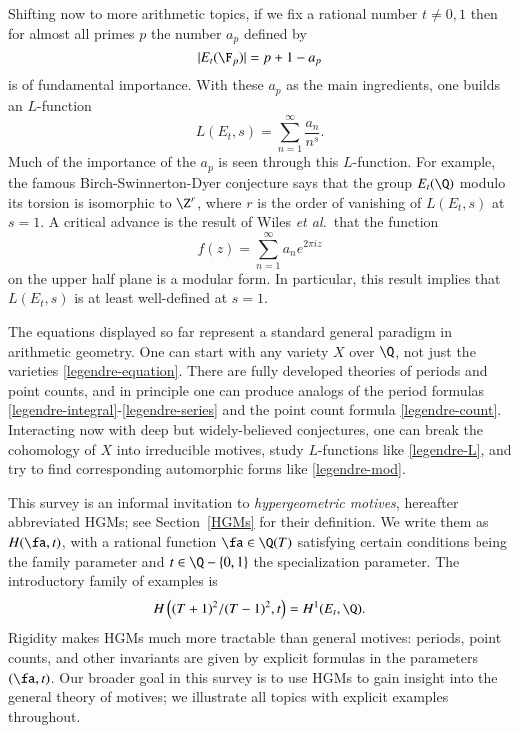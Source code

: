 \documentclass{notices}
\numberwithin{equation}{section}
\numberwithin{table}{section}
\numberwithin{figure}{section}
\begin{document}
Shifting now to more arithmetic topics, 
if we fix a rational number $t\neq 0,1$
then for almost all primes $p$ the number $a_p$ defined by
\begin{equation}
\label{legendre-count}
|E_t(\F_p)|=p+1-a_p
\end{equation}
is of fundamental importance.  With these $a_p$ as the main ingredients, one builds
an $L$-function 
\begin{equation}
\label{legendre-L} L(E_t,s) = \sum_{n=1}^\infty \frac{a_n}{n^s}.
\end{equation}
Much of the importance of the $a_p$ is seen through this 
$L$-function.  For example, the famous Birch-Swinnerton-Dyer
conjecture says that the group $E_t(\Q)$ modulo its torsion
is isomorphic to $\Z^r$, where $r$ is the order of vanishing 
of $L(E_t,s)$ at $s=1$.  A critical advance is the result of Wiles {\em et al.}\ that
the function 
\begin{equation}
\label{legendre-mod}
f(z) = \sum_{n=1}^\infty a_n e^{2 \pi i z} 
\end{equation}
on the upper half plane is a modular form.  In particular, this result
implies that $L(E_t,s)$ is at least well-defined at $s=1$. 

The equations displayed so far represent a standard general paradigm in 
arithmetic geometry.  One can start with any variety $X$ over $\Q$, not just the 
varieties \eqref{legendre-equation}.  There are fully developed
theories of periods and point counts, and in principle one can
produce analogs of the period formulas \eqref{legendre-integral}-\eqref{legendre-series} 
and the point count formula \eqref{legendre-count}. Interacting now with deep but widely-believed
conjectures, one can break the cohomology of $X$ into 
irreducible motives, study $L$-functions
like \eqref{legendre-L}, and try to find corresponding
automorphic forms like \eqref{legendre-mod}. 

This survey is an informal invitation to {\em hypergeometric
  motives}, hereafter abbreviated HGMs; see Section~\ref{HGMs} for their
  definition. We write them as $H(\fa,t)$, with a rational function
$\fa \in \Q(T)$ satisfying certain conditions being the family
parameter and $t \in \Q-\{0,1\}$ the specialization parameter.  The
introductory family of examples is
\begin{equation} 
H \left({(T+1)^2}/{(T-1)^2},t \right) = H^1(E_t,\Q).
\end{equation}
  Rigidity makes HGMs much more tractable than general motives:
  periods, point counts, and other invariants are given by explicit
  formulas in the parameters $(\fa,t)$.  Our broader goal in this survey is to use HGMs to gain
 insight into the general theory of motives; we
 illustrate all topics with explicit examples throughout. 
\end{document}
